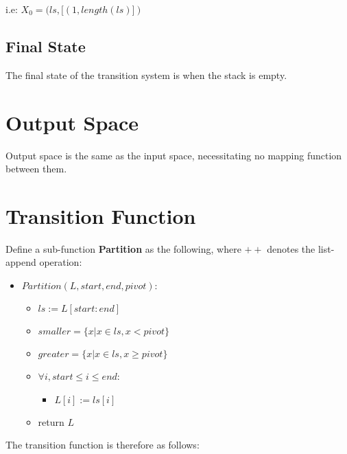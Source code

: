 \documentclass[12pt]{article}
\begin{document}
i.e: $X_0 = (ls, [(1, length(ls)])$

\subsection{Final State}

The final state of the transition system is when the stack is empty.

\section{Output Space}

Output space is the same as the input space, necessitating no mapping function between them.

\section{Transition Function}

Define a sub-function \textbf{Partition} as the following, where $++$ denotes the list-append operation:

\begin{itemize}
\item []
$Partition (L, start, end, pivot) :$
	\begin{itemize}
	\item []
	$ls := L[start : end]$
	\item []
	$smaller = \{ x | x \in ls, x < pivot \}$
	\item []
	$greater = \{ x | x \in ls, x \geq pivot \}$
	\item []
	$\forall i, start \leq i \leq end$:
		\begin{itemize}
			\item []
			$L[i] := ls[i]$
		\end{itemize}
	\item []
	return $L$
	\end{itemize}
\end{itemize}

The transition function is therefore as follows:
\end{document}
